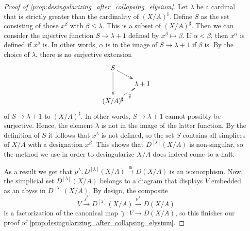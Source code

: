 \begin{proof}[Proof of \cref{prop:desingularizing_after_collapsing_elysium}]
Let $\lambda$ be a cardinal that is strictly greater than the cardinality of $(X/A)^\sharp$. Define $S$ as the set consisting of those $x^\beta$ with $\beta \leq \lambda$. This is a subset of $(X/A)^\sharp$. Then we can consider the injective function $S\to \lambda +1$ defined by $x^\beta \mapsto \beta$. If $\alpha <\beta$, then $x^\alpha$ is defined if $x^\beta$ is. In other words, $\alpha$ is in the image of $S\to \lambda +1$ if $\beta$ is. By the choice of $\lambda$, there is no surjective extension
\begin{displaymath}
\xymatrix@=1em{
S \ar[dd] \ar[dr] \\
& \lambda +1 \\
(X/A)^\sharp \ar@{-->}[ur]_\nexists
}
\end{displaymath}
of $S\to \lambda +1$ to $(X/A)^\sharp$. In other words, $S\to \lambda +1$ cannot possibly be surjective. Hence, the element $\lambda$ is not in the image of the latter function. By the definition of $S$ it follows that $x^\lambda$ is not defined, so the set $S$ contains all simplices of $X/A$ with a designation $x^\beta$. This shows that $D^{[\lambda ]}(X/A)$ is non-singular, so the method we use in order to desingularize $X/A$ does indeed come to a halt.

As a result we get that $p^\lambda :D^{[\lambda ]}(X/A)\xrightarrow{\cong } D(X/A)$ is an isomorphism. Now, the simplicial set $D^{[\lambda ]}(X/A)$ belongs to a diagram that displays $V$ embedded as an abyss in $D^{[\lambda ]}(X/A)$. By design, the composite
\[V\xrightarrow{j^\lambda } D^{[\lambda ]}(X/A)\xrightarrow{p^\lambda } D(X/A)\]
is a factorization of the canonical map $\tilde{\jmath } :V\to D(X/A)$, so this finishes our proof of \cref{prop:desingularizing_after_collapsing_elysium}.
\end{proof}


